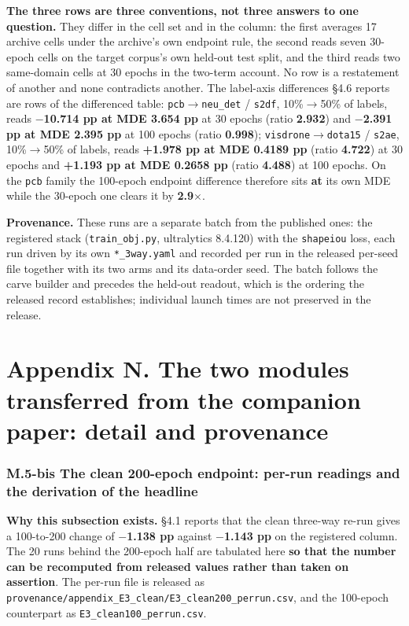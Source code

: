 \documentclass[pdflatex,sn-mathphys-ay]{sn-jnl}
\begin{document}
\textbf{The three rows are three conventions, not three answers to one question.} They differ in the cell set and in the column: the first averages 17 archive cells under the archive's own endpoint rule, the second reads seven 30-epoch cells on the target corpus's own held-out test split, and the third reads two same-domain cells at 30 epochs in the two-term account. No row is a restatement of another and none contradicts another. The label-axis differences \S{}4.6 reports are rows of the differenced table: \texttt{pcb\ensuremath{\rightarrow}neu\_det} / \texttt{s2df}, 10\%\ensuremath{\rightarrow}50\% of labels, reads \textbf{\ensuremath{-}10.714 pp at MDE 3.654 pp} at 30 epochs (ratio \textbf{2.932}) and \textbf{\ensuremath{-}2.391 pp at MDE 2.395 pp} at 100 epochs (ratio \textbf{0.998}); \texttt{visdrone\ensuremath{\rightarrow}dota15} / \texttt{s2ae}, 10\%\ensuremath{\rightarrow}50\% of labels, reads \textbf{+1.978 pp at MDE 0.4189 pp} (ratio \textbf{4.722}) at 30 epochs and \textbf{+1.193 pp at MDE 0.2658 pp} (ratio \textbf{4.488}) at 100 epochs. On the \texttt{pcb} family the 100-epoch endpoint difference therefore sits \textbf{at} its own MDE while the 30-epoch one clears it by \textbf{2.9\ensuremath{\times}}.

\textbf{Provenance.} These runs are a separate batch from the published ones: the registered stack (\texttt{train\_obj.py}, ultralytics 8.4.120) with the \texttt{shapeiou} loss, each run driven by its own \texttt{*\_3way.yaml} and recorded per run in the released per-seed file together with its two arms and its data-order seed. The batch follows the carve builder and precedes the held-out readout, which is the ordering the released record establishes; individual launch times are not preserved in the release.

\section*{Appendix N. The two modules transferred from the companion paper: detail and provenance}

\subsubsection*{M.5-bis The clean 200-epoch endpoint: per-run readings and the derivation of the headline}

\textbf{Why this subsection exists.} \S{}4.1 reports that the clean three-way re-run gives a 100-to-200 change of \textbf{\ensuremath{-}1.138 pp} against \textbf{\ensuremath{-}1.143 pp} on the registered column. The 20 runs behind the 200-epoch half are tabulated here \textbf{so that the number can be recomputed from released values rather than taken on assertion}. The per-run file is released as \texttt{provenance/appendix\_E3\_clean/E3\_clean200\_perrun.csv}, and the 100-epoch counterpart as \texttt{E3\_clean100\_perrun.csv}.
\end{document}
